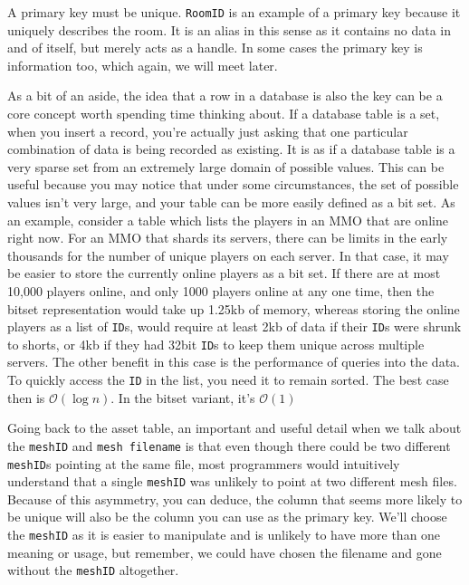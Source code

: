 \documentclass[a4paper,12pt]{article}
\begin{document}
A primary key must be unique.
\texttt{RoomID} is an example of a primary key because it uniquely describes the room.
It is an alias in this sense as it contains no data in and of itself, but merely acts as a handle.
In some cases the primary key is information too, which again, we will meet later.

As a bit of an aside, the idea that a row in a database is also the key can be a core concept worth spending time thinking about.
If a database table is a set, when you insert a record, you're actually just asking that one particular combination of data is being recorded as existing.
It is as if a database table is a very sparse set from an extremely large domain of possible values.
This can be useful because you may notice that under some circumstances, the set of possible values isn't very large, and your table can be more easily defined as a bit set.
As an example, consider a table which lists the players in an MMO that are online right now.
For an MMO that shards its servers, there can be limits in the early thousands for the number of unique players on each server.
In that case, it may be easier to store the currently online players as a bit set.
If there are at most 10,000 players online, and only 1000 players online at any one time, then the bitset representation would take up 1.25kb of memory, whereas storing the online players as a list of \texttt{ID}s, would require at least 2kb of data if their \texttt{ID}s were shrunk to shorts, or 4kb if they had 32bit \texttt{ID}s to keep them unique across multiple servers.
The other benefit in this case is the performance of queries into the data.
To quickly access the \texttt{ID} in the list, you need it to remain sorted.
The best case then is $ \mathcal{O}(\log{}n)$. In the bitset variant, it's $ \mathcal{O}(1)$

Going back to the asset table, an important and useful detail when we talk about the \texttt{meshID} and \texttt{mesh filename} is that even though there could be two different \texttt{meshID}s pointing at the same file, most programmers would intuitively understand that a single \texttt{meshID} was unlikely to point at two different mesh files.
Because of this asymmetry, you can deduce, the column that seems more likely to be unique will also be the column you can use as the primary key.
We'll choose the \texttt{meshID} as it is easier to manipulate and is unlikely to have more than one meaning or usage, but remember, we could have chosen the filename and gone without the \texttt{meshID} altogether.
\end{document}
